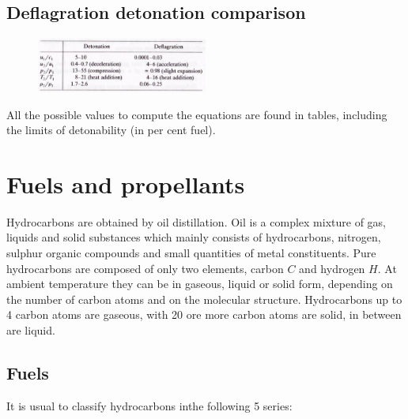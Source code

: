 \documentclass[12pt]{article}
\begin{document}
\subsection{Deflagration detonation comparison}

\begin{figure}[!ht]
\centering
\includegraphics[width=0.5\textwidth]{figures/defla.png}
\end{figure}

All the possible values to compute the equations are found in tables, including the limits of detonability (in per cent fuel).

\newpage

\section{Fuels and propellants}

Hydrocarbons are obtained by oil distillation. Oil is a complex mixture of gas, liquids and solid substances which mainly consists of hydrocarbons, nitrogen, sulphur organic compounds and small quantities of metal constituents. Pure hydrocarbons are composed of only two elements, carbon $C$ and hydrogen $H$. At ambient temperature they can be in gaseous, liquid or solid form, depending on the number of carbon atoms and on the molecular structure. Hydrocarbons up to 4 carbon atoms are gaseous, with 20 ore more carbon atoms are solid, in between are liquid.

\subsection{Fuels}

It is usual to classify hydrocarbons inthe following 5 series:
\end{document}
